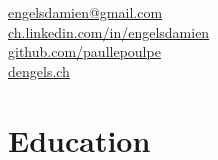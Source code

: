 \documentclass[a4paper,11pt]{article} %
\begin{document}
\pagestyle{empty} %



\par{
\bigskip
\par
} %

\vspace{-3.2cm}

\begin{flushright}

\href{mailto:engelsdamien@gmail.com}{engelsdamien@gmail.com} 
\hspace{0.1cm}
\faEnvelope{}
\\ 

\href{http://ch.linkedin.com/in/engelsdamien}{ch.linkedin.com/in/engelsdamien}
\hspace{0.1cm}
\faLinkedin{}
\\

\href{https://github.com/paullepoulpe}{github.com/paullepoulpe}
\hspace{0.1cm} 
\faGithub{}
\\

\href{http://dengels.ch}{dengels.ch}
\hspace{0.1cm} 
\faLink{} 
\\

\end{flushright}
\vspace{2cm}



\section{Education}
\end{document}
